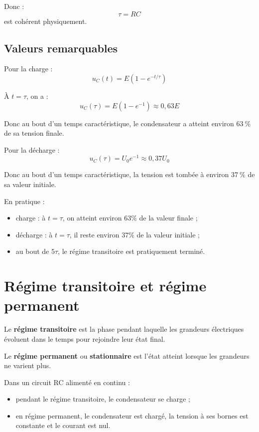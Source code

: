 \documentclass[11pt,a4paper]{article}
\begin{document}
Donc :
\[
\tau = RC
\]
est cohérent physiquement.

\subsection{Valeurs remarquables}

Pour la charge :
\[
u_C(t)=E\left(1-e^{-t/\tau}\right)
\]

À \(t=\tau\), on a :
\[
u_C(\tau)=E(1-e^{-1}) \approx 0{,}63E
\]

Donc au bout d'un temps caractéristique, le condensateur a atteint environ \(\SI{63}{\percent}\) de sa tension finale.

Pour la décharge :
\[
u_C(\tau)=U_0e^{-1}\approx 0{,}37U_0
\]

Donc au bout d'un temps caractéristique, la tension est tombée à environ \(\SI{37}{\percent}\) de sa valeur initiale.

\begin{important}
En pratique :
\begin{itemize}
    \item charge : à \(t=\tau\), on atteint environ \(63\%\) de la valeur finale ;
    \item décharge : à \(t=\tau\), il reste environ \(37\%\) de la valeur initiale ;
    \item au bout de \(5\tau\), le régime transitoire est pratiquement terminé.
\end{itemize}
\end{important}

\section{Régime transitoire et régime permanent}

\begin{definitionbox}
Le \textbf{régime transitoire} est la phase pendant laquelle les grandeurs électriques évoluent dans le temps pour rejoindre leur état final.
\end{definitionbox}

\begin{definitionbox}
Le \textbf{régime permanent} ou \textbf{stationnaire} est l'état atteint lorsque les grandeurs ne varient plus.
\end{definitionbox}

\begin{interpretation}
Dans un circuit RC alimenté en continu :
\begin{itemize}
    \item pendant le régime transitoire, le condensateur se charge ;
    \item en régime permanent, le condensateur est chargé, la tension à ses bornes est constante et le courant est nul.
\end{itemize}
\end{interpretation}
\end{document}
